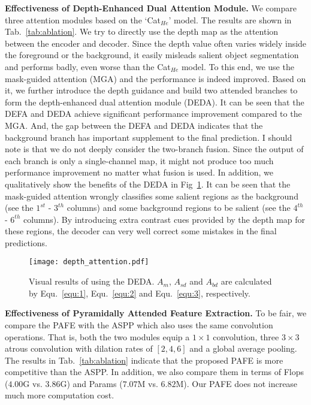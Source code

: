 \documentclass[runningheads]{llncs}
\begin{document}
\textbf{Effectiveness of Depth-Enhanced Dual Attention Module.} 
We compare three attention modules based on the `Cat$_{He}$' model. The results are shown in Tab.~\ref{tab:ablation}. We try to directly use the depth map as the attention between the encoder and decoder. Since the depth value often varies widely inside the foreground or the background, it easily misleads salient object segmentation and performs badly, even worse than the Cat$_{He}$ model. To this end, we use the mask-guided attention (MGA) and the performance is indeed improved. Based on it, we further introduce the depth guidance and build two attended branches to form the depth-enhanced dual attention module (DEDA). It can be seen that the DEFA and DEDA achieve significant performance improvement compared to the MGA. And, the gap between the DEFA and DEDA indicates that the background branch has important supplement to the final prediction. I should note is that we do not deeply consider the two-branch fusion. Since the output of each branch is only a single-channel map, it might not produce too much performance improvement no matter what fusion is used.  
In addition, we qualitatively show the benefits of the DEDA in Fig~\ref{fig:DAM_visual}. It can be seen that the mask-guided attention wrongly classifies some salient regions as the background (see the $1^{st}$ - $3^{th}$ columns) and some background regions to be salient (see the $4^{th}$ - $6^{th}$ columns). By introducing extra contrast cues provided by the depth map for these regions, the decoder can very well correct some mistakes in the final predictions.
\begin{figure}[!ht]
  \centering
  \texttt{[image: depth\_attention.pdf]}
  \caption{Visual results of using the DEDA. $A_{m}$, $A_{sd}$ and $A_{bd}$ are calculated by Equ.~\ref{equ:1}, Equ.~\ref{equ:2} and Equ.~\ref{equ:3}, respectively. }
  \label{fig:DAM_visual}
  \end{figure}
  
\textbf{Effectiveness of Pyramidally Attended Feature Extraction.} To be fair, we compare the PAFE with the ASPP which also uses the same convolution operations. That is, both the two modules equip a $1 \times 1$ convolution, three $3 \times 3$ atrous convolution with dilation rates of $[2, 4, 6]$ and a global average pooling. The results in Tab.~\ref{tab:ablation} indicate that the proposed PAFE is more competitive than the ASPP. In addition, we also compare them in terms of Flops ($4.00$G vs. $3.86$G) and Params ($7.07$M vs. $6.82$M). Our PAFE does not increase much more computation cost.
\end{document}
